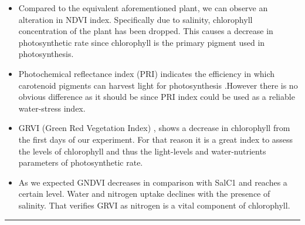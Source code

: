 \documentclass{article}
\begin{document}
{\begin{landscape}
                    \begin{itemize}
                       \item  Compared to the equivalent aforementioned plant, we can observe an alteration in NDVI index. Specifically due to salinity, chlorophyll concentration of the plant has been dropped. This causes a decrease in photosynthetic rate since chlorophyll is the primary pigment used in photosynthesis.
                       \item  Photochemical reflectance index (PRI) indicates the efficiency in which carotenoid pigments can harvest light for photosynthesis .However there is no obvious difference as it should be since PRI index could be used as a reliable water-stress index.
                        \item  GRVI (Green Red Vegetation Index) , shows a decrease in chlorophyll from the first days of our experiment. For that reason it is a great index to assess the levels of chlorophyll and thus the light-levels and water-nutrients parameters of photosynthetic rate.
                        \item  As we expected GNDVI decreases in comparison with SalC1 and reaches a certain level. Water and nitrogen uptake declines with the presence of salinity. That verifies GRVI as nitrogen is a vital component of chlorophyll.

                    \end{itemize}
                    \newpage
                    \vspace*{-3.8\baselineskip}
                    \hrule
                    \vspace*{3\baselineskip}
                    

\end{landscape}}
\end{document}
